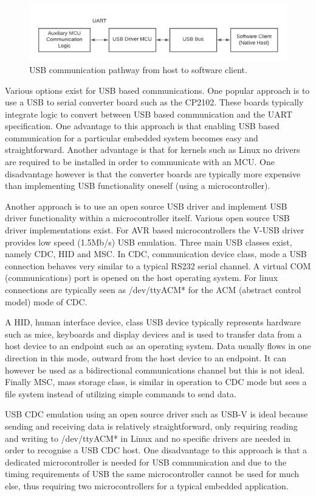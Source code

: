 \begin{figure}[]
\centering
\includegraphics[width=0.85\columnwidth]{Figures/Fig_74.png}
\caption{USB communication pathway from host to software client.}
\label{fig:gantt}
\end{figure}

Various options exist for USB based communications. One popular approach is to use a USB to serial converter board such as the CP2102. These boards typically integrate logic to convert between USB based communication and the UART specification. One advantage to this approach is that enabling USB based communication for a particular embedded system becomes easy and straightforward. Another advantage is that for kernels such as Linux no drivers are required to be installed in order to communicate with an MCU. One disadvantage however is that the converter boards are typically more expensive than implementing USB functionality oneself (using a microcontroller).

Another approach is to use an open source USB driver and implement USB driver functionality within a microcontroller itself. Various open source USB driver implementations exist. For AVR based microcontrollers the V-USB \cite{vusb} driver provides low speed (1.5Mb/s) USB emulation. Three main USB classes exist, namely CDC, HID and MSC. In CDC, communication device class, mode a USB connection behaves very similar to a typical RS232 serial channel. A virtual COM (communications) port is opened on the host operating system. For linux connections are typically seen as /dev/ttyACM* for the ACM (abstract control model) mode of CDC. 

A HID, human interface device, class USB device typically represents hardware such as mice, keyboards and display devices and is used to transfer data from a host device to an endpoint such as an operating system. Data usually flows in one direction in this mode, outward from the host device to an endpoint. It can however be used as a bidirectional communications channel but this is not ideal. Finally MSC, mass storage class, is similar in operation to CDC mode but sees a file system instead of utilizing simple commands to send data.

USB CDC emulation using an open source driver such as USB-V is ideal because sending and receiving data is relatively straightforward, only requiring reading and writing to /dev/ttyACM* in Linux and no specific drivers are needed in order to recognise a USB CDC host. One disadvantage to this approach is that a dedicated microcontroller is needed for USB communication and due to the timing requirements of USB the same microcontroller cannot be used for much else, thus requiring two microcontrollers for a typical embedded application.

